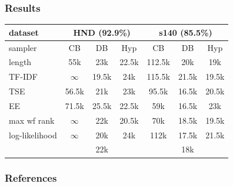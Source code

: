 \documentclass{beamer}
\begin{document}
\begin{frame}
	\frametitle{Results}
	\begin{table}
		\begin{tabular}{l|ccc|ccc}
			dataset & \multicolumn{3}{c}{HND (92.9\%)} & \multicolumn{3}{c}{s140 (85.5\%)}\\
			\hline
			sampler & CB & DB & Hyp & CB & DB & Hyp\\
			\hline
			length & 55k & 23k & 22.5k & 112.5k & 20k & 19k \\
			TF-IDF & $\infty$ & 19.5k & 24k & 115.5k & 21.5k & 19.5k \\
			TSE & 56.5k & 21k & 23k & 95.5k & 16.5k & 20.5k \\
			EE & 71.5k & 25.5k & 22.5k & 59k & 16.5k & 23k \\
			max wf rank & $\infty$ & 22k & 20.5k & 70k & 18.5k & 19.5k \\
			log-likelihood & $\infty$ & 20k & 24k & 112k & 17.5k & 21.5k\\
			\hline
			&&22k&&&18k&\\
		\end{tabular}
	\end{table}
\end{frame}

\begin{frame}
	\frametitle{References}
	
\end{frame}
\end{document}
